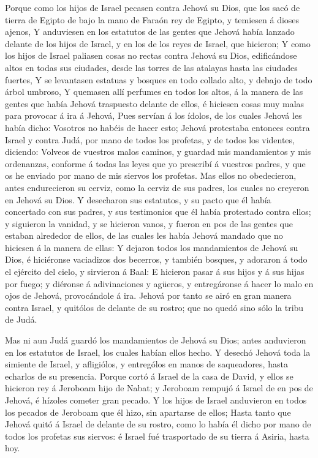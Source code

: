 Porque como los hijos de Israel pecasen contra Jehová su
Dios, que los sacó de tierra de Egipto de bajo la mano de Faraón rey de
Egipto, y temiesen á dioses ajenos,  Y anduviesen en los
estatutos de las gentes que Jehová había lanzado delante de los hijos de
Israel, y en los de los reyes de Israel, que hicieron;  Y
como los hijos de Israel paliasen cosas no rectas contra Jehová su Dios,
edificándose altos en todas sus ciudades, desde las torres de las
atalayas hasta las ciudades fuertes,  Y se levantasen
estatuas y bosques en todo collado alto, y debajo de todo árbol umbroso,
 Y quemasen allí perfumes en todos los altos, á la manera
de las gentes que había Jehová traspuesto delante de ellos, é hiciesen
cosas muy malas para provocar á ira á Jehová,  Pues servían
á los ídolos, de los cuales Jehová les había dicho: Vosotros no habéis
de hacer esto;  Jehová protestaba entonces contra Israel y
contra Judá, por mano de todos los profetas, y de todos los videntes,
diciendo: Volveos de vuestros malos caminos, y guardad mis mandamientos
y mis ordenanzas, conforme á todas las leyes que yo prescribí á vuestros
padres, y que os he enviado por mano de mis siervos los profetas.
 Mas ellos no obedecieron, antes endurecieron su cerviz,
como la cerviz de sus padres, los cuales no creyeron en Jehová su Dios.
 Y desecharon sus estatutos, y su pacto que él había
concertado con sus padres, y sus testimonios que él había protestado
contra ellos; y siguieron la vanidad, y se hicieron vanos, y fueron en
pos de las gentes que estaban alrededor de ellos, de las cuales les
había Jehová mandado que no hiciesen á la manera de ellas: 
Y dejaron todos los mandamientos de Jehová su Dios, é hiciéronse
vaciadizos dos becerros, y también bosques, y adoraron á todo el
ejército del cielo, y sirvieron á Baal:  E hicieron pasar á
sus hijos y á sus hijas por fuego; y diéronse á adivinaciones y agüeros,
y entregáronse á hacer lo malo en ojos de Jehová, provocándole á ira.
 Jehová por tanto se airó en gran manera contra Israel, y
quitólos de delante de su rostro; que no quedó sino sólo la tribu de
Judá.

 Mas ni aun Judá guardó los mandamientos de Jehová su Dios;
antes anduvieron en los estatutos de Israel, los cuales habían ellos
hecho.  Y desechó Jehová toda la simiente de Israel, y
afligiólos, y entrególos en manos de saqueadores, hasta echarlos de su
presencia.  Porque cortó á Israel de la casa de David, y
ellos se hicieron rey á Jeroboam hijo de Nabat; y Jeroboam rempujó á
Israel de en pos de Jehová, é hízoles cometer gran pecado. 
Y los hijos de Israel anduvieron en todos los pecados de Jeroboam que él
hizo, sin apartarse de ellos;  Hasta tanto que Jehová quitó
á Israel de delante de su rostro, como lo había él dicho por mano de
todos los profetas sus siervos: é Israel fué trasportado de su tierra á
Asiria, hasta hoy.


